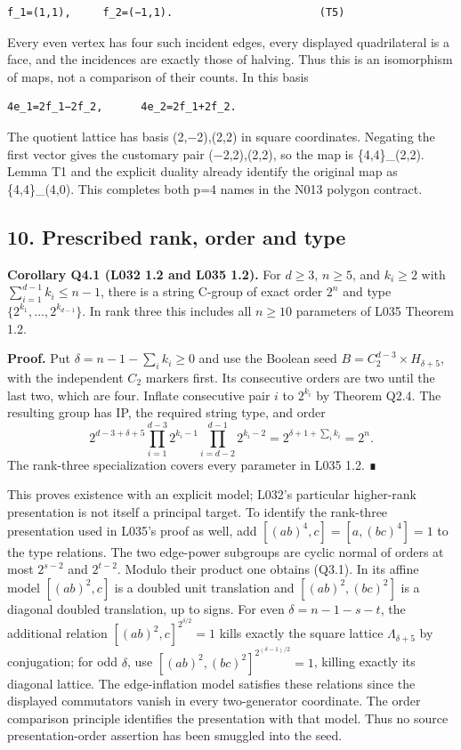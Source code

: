 \documentclass[
  10pt,
  letterpaper,
]{article}
\begin{document}
\begin{verbatim}
f_1=(1,1),     f_2=(−1,1).                       (T5)
\end{verbatim}

Every even vertex has four such incident edges, every displayed
quadrilateral is a face, and the incidences are exactly those of
halving. Thus this is an isomorphism of maps, not a comparison of their
counts. In this basis

\begin{verbatim}
4e_1=2f_1−2f_2,      4e_2=2f_1+2f_2.
\end{verbatim}

The quotient lattice has basis (2,−2),(2,2) in square coordinates.
Negating the first vector gives the customary pair (−2,2),(2,2), so the
map is \{4,4\}\_(2,2). Lemma T1 and the explicit duality already
identify the original map as \{4,4\}\_(4,0). This completes both p=4
names in the N013 polygon contract.

\subsection{10. Prescribed rank, order and
type}\label{prescribed-rank-order-and-type}

\textbf{Corollary Q4.1 (L032 1.2 and L035 1.2).} For \(d\ge3\),
\(n\ge5\), and \(k_i\ge2\) with \(\sum_{i=1}^{d-1}k_i\le n-1\), there is
a string C-group of exact order \(2^n\) and type
\(\{2^{k_1},\ldots,2^{k_{d-1}}\}\). In rank three this includes all
\(n\ge10\) parameters of L035 Theorem 1.2.

\textbf{Proof.} Put \(\delta=n-1-\sum_i k_i\ge0\) and use the Boolean
seed \(B=C_2^{d-3}\times H_{\delta+5}\), with the independent \(C_2\)
markers first. Its consecutive orders are two until the last two, which
are four. Inflate consecutive pair \(i\) to \(2^{k_i}\) by Theorem Q2.4.
The resulting group has IP, the required string type, and order \[
 2^{d-3+\delta+5}
 \prod_{i=1}^{d-3}2^{k_i-1}
 \prod_{i=d-2}^{d-1}2^{k_i-2}
 =2^{\delta+1+\sum_i k_i}=2^n.
\] The rank-three specialization covers every parameter in L035 1.2. ∎

This proves existence with an explicit model; L032's particular
higher-rank presentation is not itself a principal target. To identify
the rank-three presentation used in L035's proof as well, add
\([(ab)^4,c]=[a,(bc)^4]=1\) to the type relations. The two edge-power
subgroups are cyclic normal of orders at most \(2^{s-2}\) and
\(2^{t-2}\). Modulo their product one obtains (Q3.1). In its affine
model \([(ab)^2,c]\) is a doubled unit translation and
\([(ab)^2,(bc)^2]\) is a diagonal doubled translation, up to signs. For
even \(\delta=n-1-s-t\), the additional relation
\([(ab)^2,c]^{2^{\delta/2}}=1\) kills exactly the square lattice
\(\Lambda_{\delta+5}\) by conjugation; for odd \(\delta\), use
\([(ab)^2,(bc)^2]^{2^{(\delta-1)/2}}=1\), killing exactly its diagonal
lattice. The edge-inflation model satisfies these relations since the
displayed commutators vanish in every two-generator coordinate. The
order comparison principle identifies the presentation with that model.
Thus no source presentation-order assertion has been smuggled into the
seed.
\end{document}
